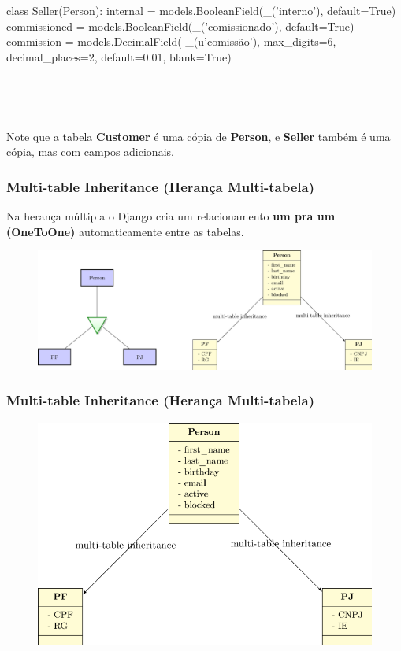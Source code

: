 \documentclass[aspectratio=169]{beamer}
\begin{document}
{\begin{frame}[fragile]
\begin{pythoncode}
class Seller(Person):
    internal = models.BooleanField(_('interno'), default=True)
    commissioned = models.BooleanField(_('comissionado'), default=True)
    commission = models.DecimalField(
        _(u'comissão'), max_digits=6, decimal_places=2, default=0.01, blank=True)
\end{pythoncode}

\

\

Note que a tabela \textbf{Customer} é uma cópia de \textbf{Person}, e \textbf{Seller} também é uma cópia, mas com campos adicionais.
\end{frame}



\begin{frame}\frametitle{Multi-table Inheritance (Herança Multi-tabela)}
    
Na herança múltipla o Django cria um relacionamento \textbf{um pra um (OneToOne)} automaticamente entre as tabelas.

    \begin{figure}[h]
      \centering
        \includegraphics[width=.93\paperwidth]{img/06multitable}
    \end{figure}

\end{frame}

\begin{frame}\frametitle{Multi-table Inheritance (Herança Multi-tabela)}
	
	\begin{figure}[h]
	  \centering
  		\includegraphics[height=.9\paperheight]{img/061multitable}
	\end{figure}


\end{frame}}
\end{document}
